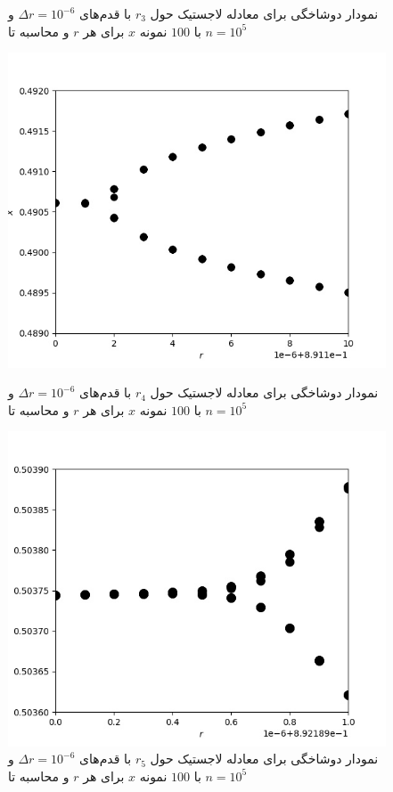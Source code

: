 \documentclass[11pt, a4paper]{article}
\begin{document}
\begin{figure}[h!]
\begin{minipage}[b]{0.42\textwidth}
    \caption{نمودار دوشاخگی برای معادله لاجستیک حول $r_3$ با قدم‌های $\Delta r = 10^{-6}$ و با $100$ نمونه $x$ برای هر $r$ و محاسبه تا $n = 10^5$}
    \label{fig:q4_r_3}
  \end{minipage}
  \begin{minipage}[b]{0.42\textwidth}
    \includegraphics[width=\textwidth]{q4_0.8911_0.89111_201_100_100000.jpg}
    \caption{نمودار دوشاخگی برای معادله لاجستیک حول $r_4$ با قدم‌های $\Delta r = 10^{-6}$ و با $100$ نمونه $x$ برای هر $r$ و محاسبه تا $n = 10^5$}
    \label{fig:q4_r_4}
  \end{minipage}
  \hfill
  \begin{minipage}[b]{0.42\textwidth}
    \includegraphics[width=\textwidth]{q4_0.892189_0.89219_21_100_100000.jpg}
    \caption{نمودار دوشاخگی برای معادله لاجستیک حول $r_5$ با قدم‌های $\Delta r = 10^{-6}$ و با $100$ نمونه $x$ برای هر $r$ و محاسبه تا $n = 10^5$}
    \label{fig:q4_r_5}
  \end{minipage}
\end{figure}
\end{document}
